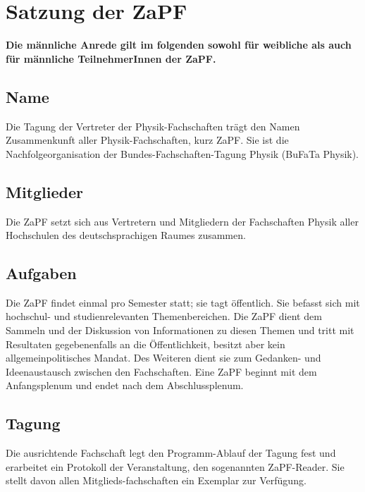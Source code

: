 \documentclass[draft,12pt,oneside]{scrreprt}
\begin{document}
\chapter*{Satzung der ZaPF}

\textbf{Die männliche Anrede gilt im folgenden sowohl für weibliche
als auch für männliche TeilnehmerInnen der ZaPF.}

\section{Name}
Die Tagung der Vertreter der Physik-Fachschaften trägt den Namen Zusammenkunft
aller Physik-Fachschaften, kurz ZaPF.  Sie ist die Nachfolgeorganisation der
Bundes-Fachschaften-Tagung Physik (BuFaTa Physik).

\section{Mitglieder}
Die ZaPF setzt sich aus Vertretern und Mitgliedern der Fachschaften Physik
aller Hochschulen des deutschsprachigen Raumes zusammen.

\section{Aufgaben}
Die ZaPF findet einmal pro Semester statt; sie tagt öffentlich. Sie befasst
sich mit hochschul- und studienrelevanten Themenbereichen.  Die ZaPF dient dem
Sammeln und der Diskussion von Informationen zu diesen Themen und tritt mit
Resultaten gegebenenfalls an die Öffentlichkeit, besitzt aber kein
allgemeinpolitisches Mandat. Des Weiteren dient sie zum Gedanken- und
Ideenaustausch zwischen den Fachschaften. Eine ZaPF beginnt mit dem
Anfangsplenum und endet nach dem Abschlussplenum.

\section{Tagung}
Die ausrichtende Fachschaft legt den Programm-Ablauf der Tagung fest und
erarbeitet ein Protokoll der Veranstaltung, den sogenannten ZaPF-Reader. Sie
stellt davon allen Mitglieds-fachschaften ein Exemplar zur Verfügung.
\end{document}
